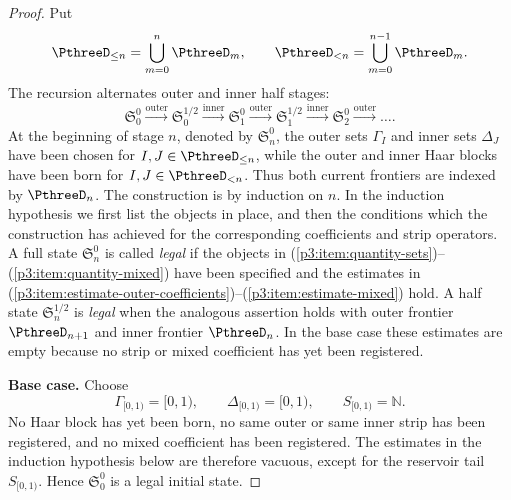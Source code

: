 \documentclass[11pt,reqno]{amsart}
\makeatletter
\theoremstyle{plain}
\theoremstyle{definition}
\newcounter{problempaper}
\newenvironment{problempaperbody}{%
  \setcounter{subsection}{0}%
  \setcounter{subsubsection}{0}%
  \setcounter{paragraph}{0}%
  \renewcommand{\thesubsection}{\arabic{subsection}}%
  \renewcommand{\thesubsubsection}{\thesubsection.\arabic{subsubsection}}%
  \renewcommand{\theparagraph}{\thesubsubsection.\arabic{paragraph}}%
  \let\problem@outersection\section
  \let\problem@outersubsection\subsection
  \let\problem@outersubsubsection\subsubsection
  \let\problem@outerparagraph\paragraph
  \let\section\problem@papersection
  \let\subsection\problem@papersubsection
  \let\subsubsection\problem@papersubsubsection
}{%
  \let\section\problem@outersection
  \let\subsection\problem@outersubsection
  \let\subsubsection\problem@outersubsubsection
  \let\paragraph\problem@outerparagraph
}
\newcommand{\problem@target}[2]{%
  \hypertarget{problem-\theproblempaper-#1-#2}{}%
}
\newcommand{\problem@paperheading}[3]{%
  \par\bigskip
  \problem@target{#1}{#2}%
  \noindent{\large\bfseries #2.\quad #3\par}%
  \nobreak\smallskip
}
\newcommand{\problem@papersubheading}[3]{%
  \par\medskip
  \problem@target{#1}{#2}%
  \noindent{\normalsize\bfseries #2.\quad #3\par}%
  \nobreak\smallskip
}
\newcommand{\problem@papersubsubheading}[3]{%
  \par\smallskip
  \problem@target{#1}{#2}%
  \noindent{\normalsize\itshape #2.\quad #3.\ }%
}
\def\problem@papersection{%
  \@ifstar{\problem@papersectionstar}{\problem@papersectionnostar}%
}
\def\problem@papersectionstar#1{%
  \par\bigskip\noindent{\large\bfseries #1\par}\nobreak\smallskip
}
\def\problem@papersectionnostar#1{%
  \refstepcounter{subsection}%
  \setcounter{subsubsection}{0}%
  \setcounter{paragraph}{0}%
  \problem@paperheading{section}{\thesubsection}{#1}%
  \problem@writecontentsline{section}{\thesubsection}{#1}%
}
\def\problem@papersubsection{%
  \@ifstar{\problem@papersubsectionstar}{\problem@papersubsectionnostar}%
}
\def\problem@papersubsectionstar#1{%
  \par\medskip\noindent{\normalsize\bfseries #1\par}\nobreak\smallskip
}
\def\problem@papersubsectionnostar#1{%
  \refstepcounter{subsubsection}%
  \setcounter{paragraph}{0}%
  \problem@papersubheading{subsection}{\thesubsubsection}{#1}%
  \problem@writecontentsline{subsection}{\thesubsubsection}{#1}%
}
\def\problem@papersubsubsection{%
  \@ifstar{\problem@papersubsubsectionstar}{\problem@papersubsubsectionnostar}%
}
\def\problem@papersubsubsectionstar#1{%
  \par\smallskip\noindent{\normalsize\itshape #1.\ }%
}
\def\problem@papersubsubsectionnostar#1{%
  \refstepcounter{paragraph}%
  \problem@papersubsubheading{subsubsection}{\theparagraph}{#1}%
  \problem@writecontentsline{subsubsection}{\theparagraph}{#1}%
}
\newcommand{\problem@writecontentsline}[3]{%
  \begingroup
  \protected@write\@auxout{}{%
    \string\problemcontentsentry{\theproblempaper}{#1}{#2}{#3}{\thepage}%
  }%
  \endgroup
}
\newcommand{\problemcontentsentry}[5]{%
  \@ifundefined{problemcontents@#1}{%
    \expandafter\gdef\csname problemcontents@#1\endcsname{}%
  }{}%
  \expandafter\g@addto@macro\csname problemcontents@#1\endcsname{%
    \problemcontentsline{#1}{#2}{#3}{#4}{#5}%
  }%
}
\newcommand{\problemcontentslink}[4]{%
  \hyperlink{problem-#1-#2-#3}{#4}%
}
\newcommand{\problemcontentsline}[5]{%
  \ifstrequal{#2}{section}{%
    \par\noindent
    \problemcontentslink{#1}{#2}{#3}{\makebox[2.5em][l]{#3}#4}%
    \nobreak\dotfill
    \problemcontentslink{#1}{#2}{#3}{#5}\par
  }{%
    \ifstrequal{#2}{subsection}{%
      \par\noindent\hspace*{1.5em}%
      \problemcontentslink{#1}{#2}{#3}{\makebox[3.5em][l]{#3}#4}%
      \nobreak\dotfill
      \problemcontentslink{#1}{#2}{#3}{#5}\par
    }{%
      \par\noindent\hspace*{3em}%
      \problemcontentslink{#1}{#2}{#3}{\makebox[4.5em][l]{#3}#4}%
      \nobreak\dotfill
      \problemcontentslink{#1}{#2}{#3}{#5}\par
    }%
  }%
}
\makeatother
\begin{document}
\begin{problempaperbody}
\begin{proof}
Put
\begin{equation*}
        \PthreeD_{\leq n}=\bigcup_{m=0}^n\PthreeD_m,\qquad \PthreeD_{<n}=\bigcup_{m=0}^{n-1}\PthreeD_m.
\end{equation*}
The recursion alternates outer and inner half stages:
\begin{equation*}
        \mathfrak S_0^0\xrightarrow{\mathrm{outer}}\mathfrak S_0^{1/2}\xrightarrow{\mathrm{inner}}\mathfrak S_1^0\xrightarrow{\mathrm{outer}}\mathfrak S_1^{1/2}\xrightarrow{\mathrm{inner}}\mathfrak S_2^0\xrightarrow{\mathrm{outer}}\ldots .
\end{equation*}
At the beginning of stage $n$, denoted by $\mathfrak S_n^0$, the outer sets $\Gamma_I$ and inner sets $\Delta_J$ have been chosen for $I,J\in\PthreeD_{\leq n}$, while the outer and inner Haar blocks have been born for $I,J\in\PthreeD_{<n}$. Thus both current frontiers are indexed by $\PthreeD_n$. The construction is by induction on $n$. In the induction hypothesis we first list the objects in place, and then the conditions which the construction has achieved for the corresponding coefficients and strip operators. A full state $\mathfrak S_n^0$ is called \emph{legal} if the objects in \textup{(\ref{p3:item:quantity-sets})}--\textup{(\ref{p3:item:quantity-mixed})} have been specified and the estimates in \textup{(\ref{p3:item:estimate-outer-coefficients})}--\textup{(\ref{p3:item:estimate-mixed})} hold. A half state $\mathfrak S_n^{1/2}$ is \emph{legal} when the analogous assertion holds with outer frontier $\PthreeD_{n+1}$ and inner frontier $\PthreeD_n$. In the base case these estimates are empty because no strip or mixed coefficient has yet been registered.

\medskip
\noindent\textbf{Base case.} Choose
\begin{equation*}
        \Gamma_{[0,1)}=[0,1),\qquad \Delta_{[0,1)}=[0,1),\qquad S_{[0,1)}=\mathbb N.
\end{equation*}
No Haar block has yet been born, no same outer or same inner strip has been registered, and no mixed coefficient has been registered. The estimates in the induction hypothesis below are therefore vacuous, except for the reservoir tail $S_{[0,1)}$. Hence $\mathfrak S_0^0$ is a legal initial state.


\end{proof}
\end{problempaperbody}
\end{document}
